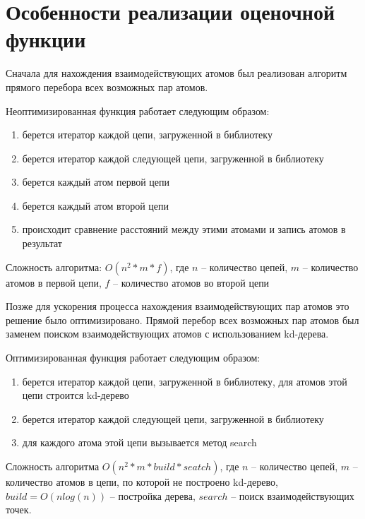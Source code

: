 \section{Особенности реализации оценочной функции}


Сначала для нахождения взаимодействующих атомов был реализован алгоритм прямого перебора всех возможных пар атомов.

Неоптимизированная функция работает следующим образом:

\begin{enumerate}
	\item берется итератор каждой цепи, загруженной в библиотеку
	\item берется итератор каждой следующей цепи, загруженной в библиотеку
	\item берется каждый атом первой цепи
	\item берется каждый атом второй цепи
	\item происходит сравнение расстояний между этими атомами и запись атомов в результат
\end{enumerate} 

Сложность алгоритма: $O(n^2 * m * f)$, где $n$ -- количество цепей, $m$ -- количество атомов в первой цепи, $f$ -- количество атомов во второй цепи

Позже для ускорения процесса нахождения взаимодействующих пар атомов это решение было оптимизировано. Прямой перебор всех возможных пар атомов был заменем поиском взаимодействующих атомов с использованием kd-дерева.

Оптимизированная функция работает следующим образом:

\begin{enumerate}
	\item берется итератор каждой цепи, загруженной в библиотеку, для атомов этой цепи строится kd-дерево
	\item берется итератор каждой следующей цепи, загруженной в библиотеку
	\item для каждого атома этой цепи вызывается метод search
\end{enumerate} 

Сложность алгоритма $O(n^2 * m * build * seatch)$, где $n$ -- количество цепей, $m$ -- количество атомов в цепи, по которой не построено kd-дерево, $build = O(n log(n))$ -- постройка дерева, $search$ -- поиск взаимодействующих точек.

